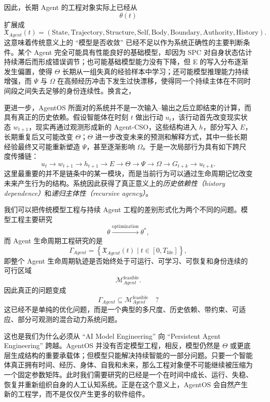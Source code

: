 因此，长期 Agent 的工程对象实际上已经从
\[
\theta(t)
\]
扩展成
\[
\boxed{
\mathfrak{X}_{Agent}(t)
=
\left(
\text{State},
\text{Trajectory},
\text{Structure},
\text{Self},
\text{Body},
\text{Boundary},
\text{Authority},
\text{History}
\right).
}
\]
这意味着传统意义上的 ``模型是否收敛'' 已经不足以作为系统正确性的主要判断条件。某个 Agent 完全可能具有性能良好的基础模型，却因为 SPC 对自身状态估计持续滞后而形成错误调节；也可能基础模型能力没有下降，但 E 的写入分布逐渐发生偏置，使得 $\Theta$ 长期从一组失真的经验样本中学习；还可能模型推理能力持续增强，而 $\Psi$ 与 $\Omega$ 在高频经历冲击下发生过快漂移，使得同一个持续主体在不同时间段之间失去足够的身份连续性。换言之，
\begin{statementbox}
\centering
{}
\end{statementbox}

更进一步，AgentOS 所面对的系统并不是一次输入--输出之后立即结束的计算，而具有真正的历史依赖。假设智能体在时刻 $t$ 做出行动 $u_t$，该行动首先改变现实状态 $w_{t+1}$，现实再通过观测形成新的 Agent-CSO，这些结构进入 $h$，部分写入 $E$，长期重复后又可能改变 $\Theta$；$\Theta$ 进一步改变未来的预测和解释方式，其中一些长期经验最终又可能重新塑造 $\Psi$，甚至逐渐影响 $\Omega$。于是一次局部行为具有如下跨尺度传播链：
\[
u_t
\rightarrow
w_{t+1}
\rightarrow
h_{t+1}
\rightarrow
E
\rightarrow
\Theta
\rightarrow
\Psi
\rightarrow
\Omega
\rightarrow
G_{t+k}
\rightarrow
u_{t+k}.
\]
这里最重要的并不是链条中的某一模块，而是当前行为可以通过生命周期记忆改变未来产生行为的结构。系统因此获得了真正意义上的\emph{历史依赖性（history dependence）}和\emph{递归主体性（recursive agency）}。

我们可以把传统模型工程与持续 Agent 工程的差别形式化为两个不同的问题。模型工程主要研究
\[
\boxed{
\theta
\xrightarrow{\text{optimization}}
\theta^{*},
}
\]
而 Agent 生命周期工程研究的是
\[
\boxed{
\Gamma_{Agent}
=
\left\{
\mathfrak X_{Agent}(t)
\mid
t\in[0,T_{\mathrm{life}}]
\right\},
}
\]
即整个 Agent 生命周期轨迹是否始终处于可运行、可学习、可恢复和身份连续的可行区域
\[
\mathcal{M}_{Agent}^{\mathrm{feasible}}.
\]
因此真正的问题变成
\[
\Gamma_{Agent}
\subseteq
\mathcal{M}_{Agent}^{\mathrm{feasible}}
\quad ?
\]
这已经不是单纯的优化问题，而是一个典型的多尺度、历史依赖、带约束、可适应、部分可观测的混合动力系统问题。

这也是我们为什么必须从 ``AI Model Engineering'' 向 ``Persistent Agent Engineering'' 跨越。AgentOS 并没有否定模型工程，相反，模型仍然是 $\Theta$ 或更底层生成结构的重要承载体；但模型只能解决持续智能的一部分问题。只要一个智能体真正拥有时间、经历、身体、自我和未来，那么工程对象便不可能继续被压缩为一个固定参数矩阵。此时我们需要研究的已经是一个在时间中成长、运行、失稳、恢复并重新组织自身的人工认知系统。正是在这个意义上，AgentOS 会自然产生新的工程学，而不是仅仅产生更多的软件组件。

